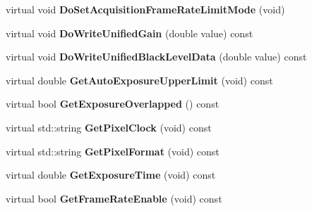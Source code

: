 \begin{DoxyCompactItemize}
\item 
\hypertarget{class_wizard_quick_setup_gen_i_cam_a8ef670b4332c9c8de153ff55ea602355}{virtual void {\bfseries Do\+Set\+Acquisition\+Frame\+Rate\+Limit\+Mode} (void)}\label{class_wizard_quick_setup_gen_i_cam_a8ef670b4332c9c8de153ff55ea602355}

\item 
\hypertarget{class_wizard_quick_setup_gen_i_cam_ae841b5600618214cbc00c69433424d61}{virtual void {\bfseries Do\+Write\+Unified\+Gain} (double value) const }\label{class_wizard_quick_setup_gen_i_cam_ae841b5600618214cbc00c69433424d61}

\item 
\hypertarget{class_wizard_quick_setup_gen_i_cam_aa08d412c2e58a17ee784349152ce5bdd}{virtual void {\bfseries Do\+Write\+Unified\+Black\+Level\+Data} (double value) const }\label{class_wizard_quick_setup_gen_i_cam_aa08d412c2e58a17ee784349152ce5bdd}

\item 
\hypertarget{class_wizard_quick_setup_gen_i_cam_acb5fc3eb444588dbea2464cf120320a3}{virtual double {\bfseries Get\+Auto\+Exposure\+Upper\+Limit} (void) const }\label{class_wizard_quick_setup_gen_i_cam_acb5fc3eb444588dbea2464cf120320a3}

\item 
\hypertarget{class_wizard_quick_setup_gen_i_cam_a3a63ee13b908838efed74a2bde176dc6}{virtual bool {\bfseries Get\+Exposure\+Overlapped} () const }\label{class_wizard_quick_setup_gen_i_cam_a3a63ee13b908838efed74a2bde176dc6}

\item 
\hypertarget{class_wizard_quick_setup_gen_i_cam_a8727b3ce09e44bf5f42f16d3f582fe2d}{virtual std\+::string {\bfseries Get\+Pixel\+Clock} (void) const }\label{class_wizard_quick_setup_gen_i_cam_a8727b3ce09e44bf5f42f16d3f582fe2d}

\item 
\hypertarget{class_wizard_quick_setup_gen_i_cam_ab00e6bf22c9652ca4eab56c63e973b47}{virtual std\+::string {\bfseries Get\+Pixel\+Format} (void) const }\label{class_wizard_quick_setup_gen_i_cam_ab00e6bf22c9652ca4eab56c63e973b47}

\item 
\hypertarget{class_wizard_quick_setup_gen_i_cam_ad1b716871f3d0199a2548ab71ad5701f}{virtual double {\bfseries Get\+Exposure\+Time} (void) const }\label{class_wizard_quick_setup_gen_i_cam_ad1b716871f3d0199a2548ab71ad5701f}

\item 
\hypertarget{class_wizard_quick_setup_gen_i_cam_ae86b6fc48e0c341487759df0f3f8012b}{virtual bool {\bfseries Get\+Frame\+Rate\+Enable} (void) const }\label{class_wizard_quick_setup_gen_i_cam_ae86b6fc48e0c341487759df0f3f8012b}


\end{DoxyCompactItemize}
